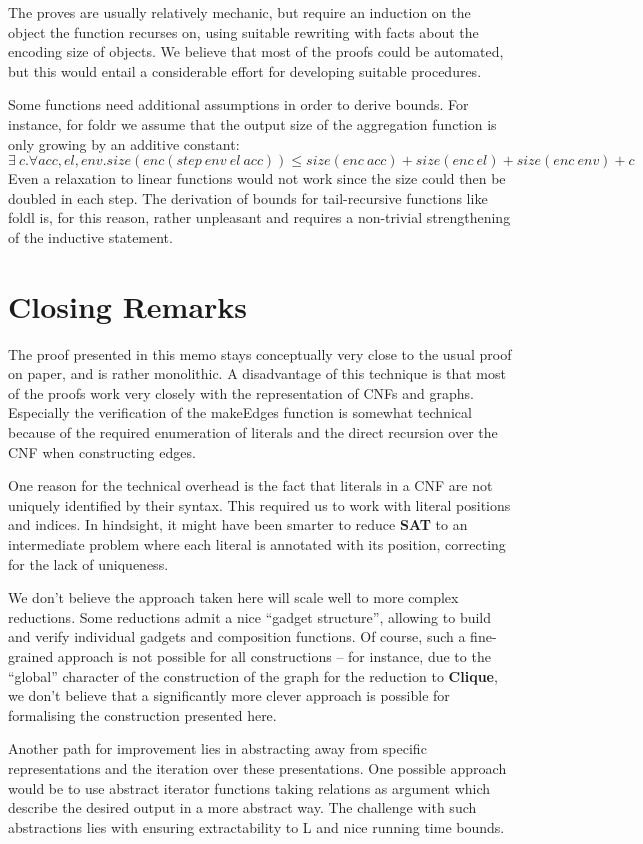 \documentclass[a4paper,UKenglish,cleveref, autoref]{lipics-v2019}
\begin{document}
The proves are usually relatively mechanic, but require an induction on the object the function recurses on, using suitable rewriting with facts about the encoding size of objects. We believe that most of the proofs could be automated, but this would entail a considerable effort for developing suitable procedures.

Some functions need additional assumptions in order to derive bounds. For instance, for \textsf{foldr} we assume that the output size of the aggregation function is only growing by an additive constant:
\[ \exists~c. \forall acc, el, env. size(enc (step~env~el~acc)) \le size(enc~acc) + size(enc~el) + size(enc~env) + c \]
Even a relaxation to linear functions would not work since the size could then be doubled in each step.
The derivation of bounds for tail-recursive functions like \textsf{foldl} is, for this reason, rather unpleasant and requires a non-trivial strengthening of the inductive statement.

\section{Closing Remarks}
The proof presented in this memo stays conceptually very close to the usual proof on paper, and is rather monolithic. A disadvantage of this technique is that most of the proofs work very closely with the representation of CNFs and graphs. Especially the verification of the \textsf{makeEdges} function is somewhat technical because of the required enumeration of literals and the direct recursion over the CNF when constructing edges.

One reason for the technical overhead is the fact that literals in a CNF are not uniquely identified by their syntax. This required us to work with literal positions and indices. In hindsight, it might have been smarter to reduce \textbf{SAT} to an intermediate problem where each literal is annotated with its position, correcting for the lack of uniqueness.

We don't believe the approach taken here will scale well to more complex reductions. Some reductions admit a nice ``gadget structure'', allowing to build and verify individual gadgets and composition functions. Of course, such a fine-grained approach is not possible for all constructions -- for instance, due to the ``global'' character of the construction of the graph for the reduction to \textbf{Clique}, we don't believe that a significantly more clever approach is possible for formalising the construction presented here.

Another path for improvement lies in abstracting away from specific representations and the iteration over these presentations. One possible approach would be to use abstract iterator functions taking relations as argument which describe the desired output in a more abstract way. The challenge with such abstractions lies with ensuring extractability to L and nice running time bounds. 

{}
\end{document}
